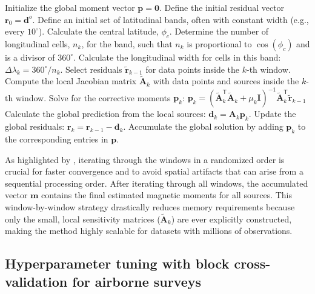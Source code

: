 \documentclass[onecolumn,10pt,a4paper]{article}
\begin{document}
\begin{algorithm}
\caption{Gradient-Boosted Equivalent Sources on the sphere.}
\label{alg:spherical-gradient-boosting}
\begin{algorithmic}[1]
\State Initialize the global moment vector $\mathbf{p} = \mathbf{0}$.
\State Define the initial residual vector $\mathbf{r}_0 = \mathbf{d}^o$.
\State Define an initial set of latitudinal bands, often with constant width (e.g., every $10^\circ$).
    \State Calculate the central latitude, $\phi_c$.
    \State Determine the number of longitudinal cells, $n_k$, for the band, such that $n_k$ is proportional to $\cos(\phi_c)$ and is a divisor of $360^\circ$.
    \State Calculate the longitudinal width for cells in this band: $\Delta\lambda_k = 360^\circ / n_k$.
\EndFor
{}
    \State Select residuals $\tilde{\mathbf{r}}_{k-1}$ for data points inside the $k$-th window.
    \State Compute the local Jacobian matrix $\tilde{\mathbf{A}}_k$ with data points and sources inside the $k$-th window.
    \State Solve for the corrective moments $\mathbf{p}_k$:
    \Statex \hspace{\algorithmicindent} $\mathbf{p}_k = (\tilde{\mathbf{A}}_k^\mathsf{T} \tilde{\mathbf{A}}_k + \mu_k \mathbf{I})^{-1} \tilde{\mathbf{A}}_k^\mathsf{T} \tilde{\mathbf{r}}_{k-1}$
    \State Calculate the global prediction from the local sources: $\mathbf{d}_k
    = \mathbf{A}_k \mathbf{p}_k$.
    \State Update the global residuals: $\mathbf{r}_k = \mathbf{r}_{k-1} - \mathbf{d}_k$.
    \State Accumulate the global solution by adding $\mathbf{p}_k$ to the
    corresponding entries in $\mathbf{p}$.
\EndFor
\end{algorithmic}
\end{algorithm}

As highlighted by \citet{Soler2021}, iterating through the windows in a randomized order is crucial
for faster convergence and to avoid spatial artifacts that can arise from a sequential processing
order. After iterating through all windows, the accumulated vector $\mathbf{m}$ contains the final
estimated magnetic moments for all sources. This window-by-window strategy drastically reduces memory
requirements because only the small, local sensitivity matrices ($\tilde{\mathbf{A}}_k$) are ever
explicitly constructed, making the method highly scalable for datasets with millions of observations.


\subsection{Hyperparameter tuning with block cross-validation for airborne surveys}
\end{document}
